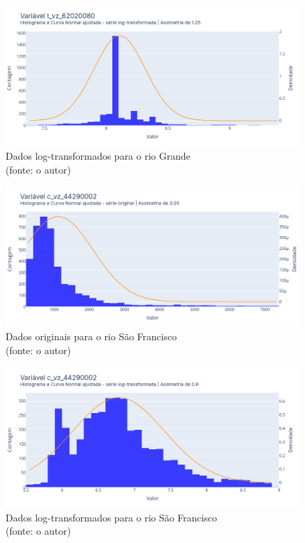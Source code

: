 \begin{figure}[!h]
	\centering
	\includegraphics[scale=0.33]{Figuras/rio_grande/rio_grande_depois_log.png}
	\caption{Dados log-transformados para o rio Grande\\(fonte: o autor)}
	\label{fig:rio_grande_depois_log}
\end{figure}

\begin{figure}[!h]
	\centering
	\includegraphics[scale=0.33]{Figuras/rio_sao_francisco/rio_sao_francisco_antes_log.png}
	\caption{Dados originais para o rio São Francisco\\(fonte: o autor)}
	\label{fig:rio_sao_francisco_antes_log}
\end{figure}

\begin{figure}[!h]
	\centering
	\includegraphics[scale=0.33]{Figuras/rio_sao_francisco/rio_sao_francisco_depois_log.png}
	\caption{Dados log-transformados para o rio São Francisco\\(fonte: o autor)}
	\label{fig:rio_sao_francisco_depois_log}
\end{figure}
\clearpage

